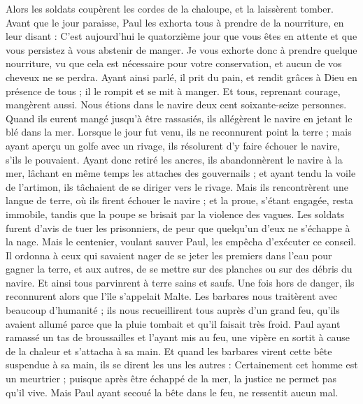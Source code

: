 \begin{multicols}{2}
Alors les soldats coupèrent les cordes de la chaloupe, et la laissèrent tomber.
Avant que le jour paraisse, Paul les exhorta tous à prendre de la nourriture, en leur disant : C’est aujourd'hui le quatorzième jour que vous êtes en attente et que vous persistez à vous abstenir de manger.
Je vous exhorte donc à prendre quelque nourriture, vu que cela est nécessaire pour votre conservation, et aucun de vos cheveux ne se perdra.
Ayant ainsi parlé, il prit du pain, et rendit grâces à Dieu en présence de tous ; il le rompit et se mit à manger.
Et tous, reprenant courage, mangèrent aussi.
Nous étions dans le navire deux cent soixante-seize personnes.
Quand ils eurent mangé jusqu'à être rassasiés, ils allégèrent le navire en jetant le blé dans la mer.
Lorsque le jour fut venu, ils ne reconnurent point la terre ; mais ayant aperçu un golfe avec un rivage, ils résolurent d'y faire échouer le navire, s’ils le pouvaient.
Ayant donc retiré les ancres, ils abandonnèrent le navire à la mer, lâchant en même temps les attaches des gouvernails ; et ayant tendu la voile de l'artimon, ils tâchaient de se diriger vers le rivage.
Mais ils rencontrèrent une langue de terre, où ils firent échouer le navire ; et la proue, s’étant engagée, resta immobile, tandis que la poupe se brisait par la violence des vagues.
Les soldats furent d’avis de tuer les prisonniers, de peur que quelqu’un d’eux ne s’échappe à la nage.
Mais le centenier, voulant sauver Paul, les empêcha d'exécuter ce conseil. Il ordonna à ceux qui savaient nager de se jeter les premiers dans l’eau pour gagner la terre,
et aux autres, de se mettre sur des planches ou sur des débris du navire. Et ainsi tous parvinrent à terre sains et saufs.
\VerseOne{}Une fois hors de danger, ils reconnurent alors que l'île s'appelait Malte.
Les barbares nous traitèrent avec beaucoup d’humanité ; ils nous recueillirent tous auprès d’un grand feu, qu’ils avaient allumé parce que la pluie tombait et qu’il faisait très froid.
Paul ayant ramassé un tas de broussailles et l’ayant mis au feu, une vipère en sortit à cause de la chaleur et s’attacha à sa main.
Et quand les barbares virent cette bête suspendue à sa main, ils se dirent les uns les autres : Certainement cet homme est un meurtrier ; puisque après être échappé de la mer, la justice ne permet pas qu'il vive. 
Mais Paul ayant secoué la bête dans le feu, ne ressentit aucun mal.

\end{multicols}
